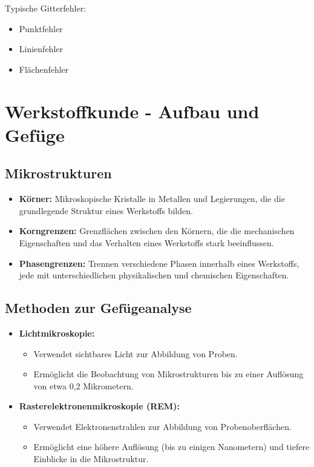 \documentclass[a4paper,12pt]{article}
\begin{document}
Typische Gitterfehler:
\begin{itemize}
    \item Punktfehler
    \item Linienfehler
    \item Flächenfehler
\end{itemize}



\newpage

\section{Werkstoffkunde - Aufbau und Gefüge}

\subsection{Mikrostrukturen}
\begin{itemize}
    \item \textbf{Körner:} Mikroskopische Kristalle in Metallen und Legierungen, die die grundlegende Struktur eines Werkstoffs bilden.
    \item \textbf{Korngrenzen:} Grenzflächen zwischen den Körnern, die die mechanischen Eigenschaften und das Verhalten eines Werkstoffs stark beeinflussen.
    \item \textbf{Phasengrenzen:} Trennen verschiedene Phasen innerhalb eines Werkstoffs, jede mit unterschiedlichen physikalischen und chemischen Eigenschaften.
\end{itemize}

\subsection{Methoden zur Gefügeanalyse}
\begin{itemize}
    \item \textbf{Lichtmikroskopie:}
    \begin{itemize}
        \item Verwendet sichtbares Licht zur Abbildung von Proben.
        \item Ermöglicht die Beobachtung von Mikrostrukturen bis zu einer Auflösung von etwa 0,2 Mikrometern.
    \end{itemize}
    \item \textbf{Rasterelektronenmikroskopie (REM):}
    \begin{itemize}
        \item Verwendet Elektronenstrahlen zur Abbildung von Probenoberflächen.
        \item Ermöglicht eine höhere Auflösung (bis zu einigen Nanometern) und tiefere Einblicke in die Mikrostruktur.
    \end{itemize}
\end{itemize}
\end{document}
